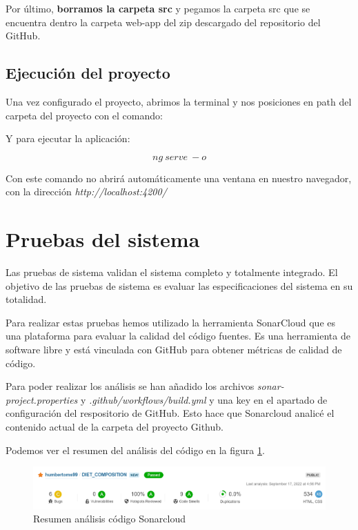 Por último, \textbf{borramos la carpeta src} y pegamos la carpeta src  que se encuentra dentro la carpeta web-app del zip descargado del repositorio del GitHub.

\subsection{Ejecución del proyecto}

Una vez configurado el proyecto, abrimos la terminal y nos posiciones en path del carpeta del proyecto con el comando:



Y para ejecutar la aplicación:

$$ ng\:serve\:-o $$

Con este comando no abrirá automáticamente una ventana en nuestro navegador, con la dirección \textit{http://localhost:4200/} 



\section{Pruebas del sistema}

Las pruebas de sistema validan el sistema completo y totalmente integrado. El objetivo de las pruebas de sistema es evaluar las especificaciones del sistema en su totalidad.

Para realizar estas pruebas hemos utilizado la herramienta SonarCloud que es una plataforma para evaluar la calidad del código fuentes. Es una herramienta de software libre y está vinculada con GitHub para obtener métricas de calidad de código.

Para poder realizar los análisis se han añadido los archivos \textit{sonar-project.properties} y \textit{.github/workflows/build.yml} y una key en el apartado de configuración del respositorio de GitHub. Esto hace que Sonarcloud analicé el contenido actual de la carpeta del proyecto Github.

Podemos ver el resumen del análisis del código en la figura \ref{fig:sonarcloud_res}. 

\begin{figure}[h!] 
\centering
    \includegraphics[width=1\textwidth]{img/sonarcloud_res_1.PNG}
\caption{Resumen análisis código Sonarcloud}
\label{fig:sonarcloud_res}
\end{figure}

